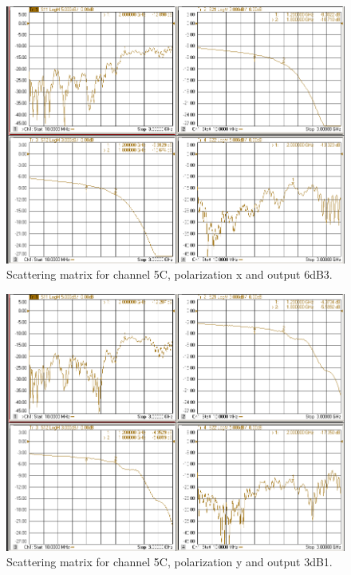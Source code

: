 \documentclass[12pt,a4paper,oneside]{article}
\begin{document}
\begin{figure}[H]
\centering
\includegraphics[width=0.9\linewidth]{VNA_results/5Cx_6dB3.png}
\caption{Scattering matrix for channel 5C, polarization x and output 6dB3.}
\label{fig:5Cx_6dB3}
\end{figure}


\begin{figure}[H]
\centering
\includegraphics[width=0.9\linewidth]{VNA_results/5Cy_3dB1.png}
\caption{Scattering matrix for channel 5C, polarization y and output 3dB1.}
\label{fig:5Cy_3dB1}
\end{figure}
\end{document}
